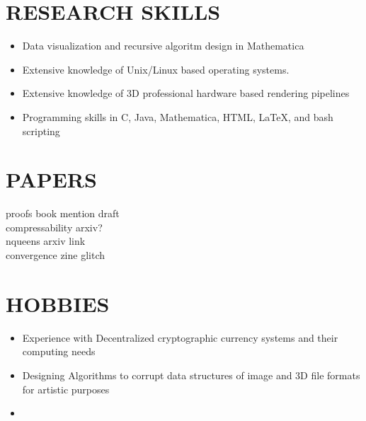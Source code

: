 \documentclass[11pt]{article} %
\begin{document}
\section*{RESEARCH SKILLS}
\begin{itemize}
\item Data visualization and recursive algoritm design in Mathematica
\item Extensive knowledge of Unix/Linux based operating systems.
\item Extensive knowledge of 3D professional hardware based rendering pipelines
\item Programming skills in C, Java, Mathematica, HTML, \LaTeX , and bash scripting
\end{itemize}
\section*{PAPERS}
proofs book mention draft\\
compressability arxiv?\\
nqueens arxiv link\\
convergence zine glitch\\

\section*{HOBBIES}
\begin{itemize}
\item Experience with Decentralized cryptographic currency systems and their computing needs
\item Designing Algorithms to corrupt data structures of image and 3D file formats for artistic purposes
\item 
\end{itemize}
\end{document}
